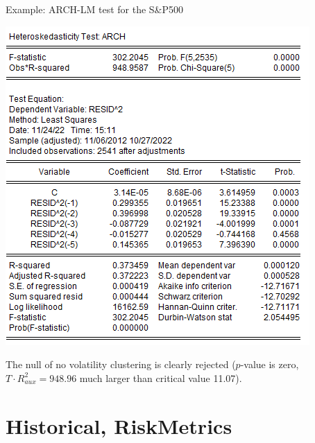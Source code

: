 \begin{frame}
\begin{block}{Example: ARCH-LM test for the S\&P500}
\begin{center}
\includegraphics[height=.6\textheight]{sp500_archlm}
\end{center}
\small The null of no volatility clustering is clearly rejected ($p$-value is zero, $T\cdot R^2_{aux}=948.96$ much larger than critical value 11.07).
\end{block}
\end{frame}
\section{Historical, RiskMetrics}\subsection*{}

